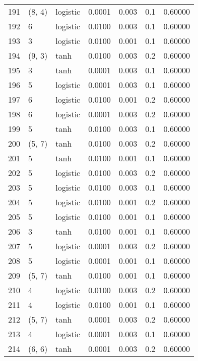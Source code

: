 \begin{tabular}{lllrrrr}
191 &      (8, 4) &  logistic &  0.0001 &  0.003 &  0.1 &   0.60000 \\
192 &           6 &  logistic &  0.0100 &  0.003 &  0.1 &   0.60000 \\
193 &           3 &  logistic &  0.0100 &  0.001 &  0.1 &   0.60000 \\
194 &      (9, 3) &      tanh &  0.0100 &  0.003 &  0.2 &   0.60000 \\
195 &           3 &      tanh &  0.0001 &  0.003 &  0.1 &   0.60000 \\
196 &           5 &  logistic &  0.0001 &  0.003 &  0.1 &   0.60000 \\
197 &           6 &  logistic &  0.0100 &  0.001 &  0.2 &   0.60000 \\
198 &           6 &  logistic &  0.0001 &  0.003 &  0.2 &   0.60000 \\
199 &           5 &      tanh &  0.0100 &  0.003 &  0.1 &   0.60000 \\
200 &      (5, 7) &      tanh &  0.0100 &  0.003 &  0.2 &   0.60000 \\
201 &           5 &      tanh &  0.0100 &  0.001 &  0.1 &   0.60000 \\
202 &           5 &  logistic &  0.0100 &  0.003 &  0.2 &   0.60000 \\
203 &           5 &  logistic &  0.0100 &  0.003 &  0.1 &   0.60000 \\
204 &           5 &  logistic &  0.0100 &  0.001 &  0.2 &   0.60000 \\
205 &           5 &  logistic &  0.0100 &  0.001 &  0.1 &   0.60000 \\
206 &           3 &      tanh &  0.0100 &  0.001 &  0.1 &   0.60000 \\
207 &           5 &  logistic &  0.0001 &  0.003 &  0.2 &   0.60000 \\
208 &           5 &  logistic &  0.0001 &  0.001 &  0.1 &   0.60000 \\
209 &      (5, 7) &      tanh &  0.0100 &  0.001 &  0.1 &   0.60000 \\
210 &           4 &  logistic &  0.0100 &  0.003 &  0.2 &   0.60000 \\
211 &           4 &  logistic &  0.0100 &  0.001 &  0.1 &   0.60000 \\
212 &      (5, 7) &      tanh &  0.0001 &  0.003 &  0.2 &   0.60000 \\
213 &           4 &  logistic &  0.0001 &  0.003 &  0.1 &   0.60000 \\
214 &      (6, 6) &      tanh &  0.0001 &  0.003 &  0.2 &   0.60000 \\

\end{tabular}
